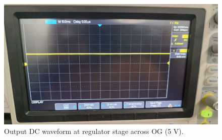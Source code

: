 \documentclass[journal,12pt,twocolumn]{IEEEtran}
\begin{document}
\begin{figure}[!ht]
    \includegraphics[width=\columnwidth]{figs/figure4.jpg}
    \caption{Output DC waveform at regulator stage across OG (5 V).}
    \label{fig:regulator_dc}
\end{figure}
\end{document}
